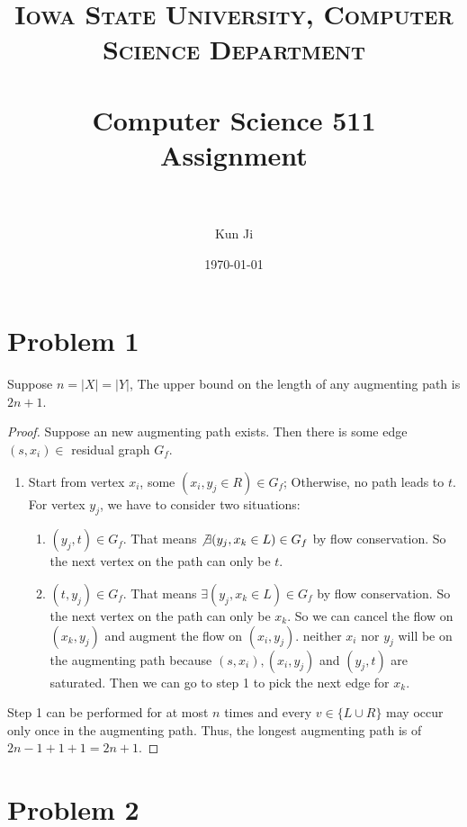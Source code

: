 \documentclass[paper=a4, fontsize=12pt]{scrartcl} %
\title{	
\normalfont \normalsize 
\textsc{Iowa State University, Computer Science Department} \\ [25pt] %
\horrule{0.5pt} \\[0.4cm] %
\huge Computer Science 511 \\ Assignment \uppercase\expandafter{\romannumeral2} \\ %
\horrule{2pt} \\[0.5cm] %
}
\author{Kun Ji} %
\date{\normalsize\today} %
\numberwithin{equation}{section} %
\numberwithin{figure}{section} %
\numberwithin{table}{section} %
\begin{document}
\maketitle %

\section*{Problem 1}
Suppose $n=|X|=|Y|$, 
The upper bound on the length of any augmenting path is $2n+1$.
\begin{proof}
Suppose an new augmenting path exists. Then there is some edge $(s,x_i) \in $ residual graph $G_f$. \par
\begin{enumerate}
\item Start from vertex $x_i$, some $(x_i,y_j \in R) \in G_f$; Otherwise, no path leads to $t$. For vertex $y_j$, we have to consider two situations:
\begin{enumerate}
\item $(y_j,t) \in G_f$. That means $\not \exists(y_j, x_k \in L) \in G_f$ by flow conservation. So the next vertex on the path can only be $t$.
\item $(t,y_j) \in G_f$. That means $\exists(y_j, x_k \in L) \in G_f$ by flow conservation. So the next vertex on the path can only be $x_k$. So we can cancel the flow on $(x_k,y_j)$ and augment the flow on $(x_i,y_j)$. neither $x_i$ nor $y_j$ will be on the augmenting path because $(s,x_i),(x_i,y_j)$ and $(y_j,t)$ are saturated. Then we can go to step 1 to pick the next edge for $x_k$.
\end{enumerate}
\end{enumerate}

Step 1 can be performed for at most $n$ times and every $v \in \{L \cup R\}$ may occur only once in the augmenting path. Thus, the longest augmenting path is of $2n-1+1+1 = 2n+1$.

\end{proof}

\section*{Problem 2}
\end{document}
